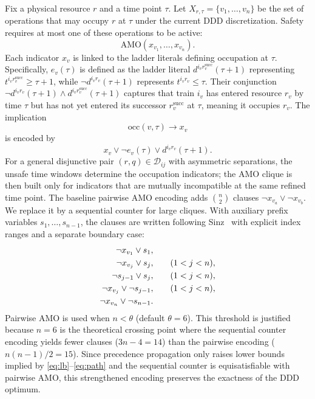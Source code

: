 \documentclass[runningheads]{llncs}
\begin{document}
Fix a physical resource $r$ and a time point $\tau$. Let
$X_{r,\tau}=\{v_1,\ldots,v_n\}$ be the set of operations that may occupy $r$ at
$\tau$ under the current DDD discretization. Safety requires at most one of
these operations to be active:
\begin{equation}
\mathrm{AMO}(x_{v_1},\ldots,x_{v_n}).
\label{eq:amo}
\end{equation}
Each indicator $x_v$ is linked to the ladder literals defining occupation at
$\tau$. Specifically, $e_v(\tau)$ is defined as the ladder literal $d^{i_v r_v^{\text{succ}}}(\tau+1)$ representing $t^{i_v r_v^{\text{succ}}} \ge \tau+1$, while $\neg d^{i_v r_v}(\tau+1)$ represents $t^{i_v r_v} \le \tau$. Their conjunction $\neg d^{i_v r_v}(\tau+1) \wedge d^{i_v r_v^{\text{succ}}}(\tau+1)$ captures that train $i_v$ has entered resource $r_v$ by time $\tau$ but has not yet entered its successor $r_v^{\text{succ}}$ at $\tau$, meaning it occupies $r_v$. The implication
\[
\mathrm{occ}(v,\tau)\rightarrow x_v
\]
is encoded by
\begin{equation}
x_v \vee \neg e_v(\tau) \vee d^{i_v r_v}(\tau+1).
\label{eq:occind}
\end{equation}
For a general disjunctive pair $(r,q)\in\mathcal D_{ij}$ with asymmetric
separations, the unsafe time windows determine the occupation indicators; the
AMO clique is then built only for indicators that are mutually incompatible at
the same refined time point.
The baseline pairwise AMO encoding adds $\binom n2$ clauses
$\neg x_{v_a}\vee \neg x_{v_b}$. We replace it by a sequential counter for
large cliques. With auxiliary prefix variables $s_1,\ldots,s_{n-1}$, the clauses
are written following Sinz~\cite{Sinz2005} with explicit index ranges and a separate boundary case:
\begin{align}
\neg x_{v_1} \vee s_1, & \label{eq:sc} \\
\neg x_{v_j} \vee s_j, & \qquad (1 < j < n), \notag \\
\neg s_{j-1} \vee s_j, & \qquad (1 < j < n), \notag \\
\neg x_{v_j} \vee \neg s_{j-1}, & \qquad (1 < j < n), \notag \\
\neg x_{v_n} \vee \neg s_{n-1}. & \notag
\end{align}
Pairwise AMO is used when $n < \theta$ (default $\theta=6$). This threshold is justified because $n=6$ is the theoretical crossing point where the sequential counter encoding yields fewer clauses ($3n - 4 = 14$) than the pairwise encoding ($n(n-1)/2 = 15$). Since precedence propagation only raises lower bounds implied by \eqref{eq:lb}--\eqref{eq:path} and the sequential counter is equisatisfiable with pairwise AMO, this strengthened encoding preserves the exactness of the DDD optimum.
\end{document}
